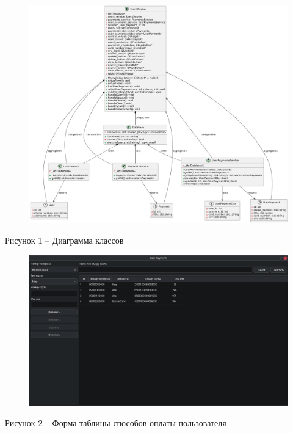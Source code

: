 \documentclass[a4paper,14pt]{extarticle}
\begin{document}
  \begin{figure}[h]
    \centering
    \includegraphics[width=1\linewidth]{img/uml-cpp.png}
  \end{figure}
  \begin{center}
    Рисунок 1 – Диаграмма классов
  \end{center}

  \pagebreak
  \begin{figure}[h]
    \centering
    \includegraphics[width=0.95\linewidth]{img/f-1}
  \end{figure}
  \begin{center}
    Рисунок 2 – Форма таблицы способов оплаты пользователя
  \end{center}
\end{document}
